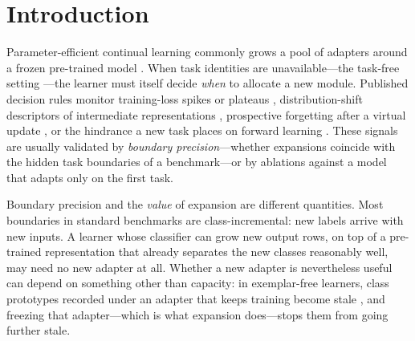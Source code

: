 \documentclass[10pt]{article}
\begin{document}
\section{Introduction}

Parameter-efficient continual learning commonly grows a pool of adapters around a frozen pre-trained model \citep{zhou2024ease,wang2025sema,wei2025onlinelora}. When task identities are unavailable---the task-free setting \citep{aljundi2019taskfree}---the learner must itself decide \emph{when} to allocate a new module. Published decision rules monitor training-loss spikes or plateaus \citep{wei2025onlinelora,tathe2026lace}, distribution-shift descriptors of intermediate representations \citep{wang2025sema}, prospective forgetting after a virtual update \citep{julian2025cable}, or the hindrance a new task places on forward learning \citep{feng2024lw2g}. These signals are usually validated by \emph{boundary precision}---whether expansions coincide with the hidden task boundaries of a benchmark---or by ablations against a model that adapts only on the first task.

Boundary precision and the \emph{value} of expansion are different quantities. Most boundaries in standard benchmarks are class-incremental: new labels arrive with new inputs. A learner whose classifier can grow new output rows, on top of a pre-trained representation that already separates the new classes reasonably well, may need no new adapter at all. Whether a new adapter is nevertheless useful can depend on something other than capacity: in exemplar-free learners, class prototypes recorded under an adapter that keeps training become stale \citep{yu2020sdc}, and freezing that adapter---which is what expansion does---stops them from going further stale.
\end{document}
